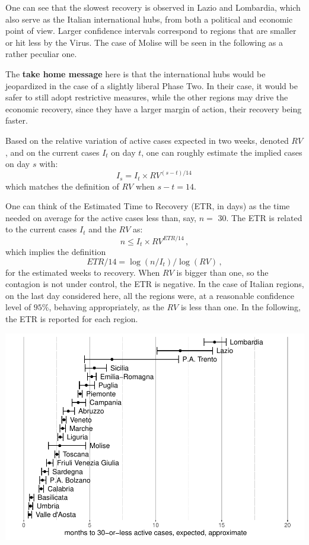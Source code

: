 \documentclass[
  6pt,
]{article}
\begin{document}
One can see that the slowest recovery is observed in Lazio and
Lombardia, which also serve as the Italian international hubs, from both
a political and economic point of view. Larger confidence intervals
correspond to regions that are smaller or hit less by the Virus. The
case of Molise will be seen in the following as a rather peculiar one.

The \textbf{take home message} here is that the international hubs would
be jeopardized in the case of a slightly liberal Phase Two. In their
case, it would be safer to still adopt restrictive measures, while the
other regions may drive the economic recovery, since they have a larger
margin of action, their recovery being faster.

Based on the relative variation of active cases expected in two weeks,
denoted \(RV\), and on the current cases \(I_t\) on day \(t\), one can
roughly estimate the implied cases on day \(s\) with:
\[I_s = I_t \times RV^{(s-t)/14}\,\] which matches the definition of
\(RV\) when \(s-t=14\).

One can think of the Estimated Time to Recovery (ETR, in days) as the
time needed on average for the active cases less than, say, \(n=\) 30.
The ETR is related to the current cases \(I_t\) and the \(RV\) as:
\[n \leq I_t \times RV^{ETR/14} \,,\] which implies the definition
\[ETR/14 = \log(n/I_t)/\log(RV) \,,\] for the estimated weeks to
recovery. When \(RV\) is bigger than one, so the contagion is not under
control, the ETR is negative. In the case of Italian regions, on the
last day considered here, all the regions were, at a reasonable
confidence level of \(95\%\), behaving appropriately, as the \(RV\) is
less than one. In the following, the ETR is reported for each region.

\begin{center}\includegraphics{Report_SC_Group3_files/figure-latex/unnamed-chunk-35-1} \end{center}
\end{document}
